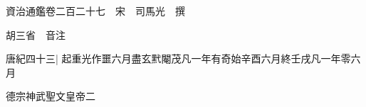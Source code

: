 






























































資治通鑑卷二百二十七　宋　司馬光　撰

胡三省　音注

唐紀四十三|{
	起重光作噩六月盡玄黓閹茂凡一年有奇始辛酉六月終壬戌凡一年零六月}


德宗神武聖文皇帝二

